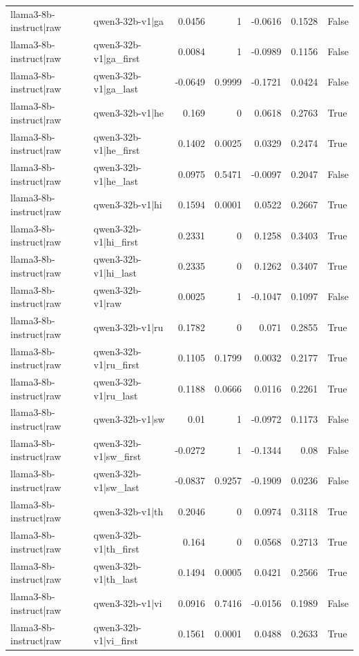 \begin{table}
\begin{tabular}{l l r r r r l}
llama3-8b-instruct|raw & qwen3-32b-v1|ga & 0.0456 & 1 & -0.0616 & 0.1528 & False \\
llama3-8b-instruct|raw & qwen3-32b-v1|ga_first & 0.0084 & 1 & -0.0989 & 0.1156 & False \\
llama3-8b-instruct|raw & qwen3-32b-v1|ga_last & -0.0649 & 0.9999 & -0.1721 & 0.0424 & False \\
llama3-8b-instruct|raw & qwen3-32b-v1|he & 0.169 & 0 & 0.0618 & 0.2763 & True \\
llama3-8b-instruct|raw & qwen3-32b-v1|he_first & 0.1402 & 0.0025 & 0.0329 & 0.2474 & True \\
llama3-8b-instruct|raw & qwen3-32b-v1|he_last & 0.0975 & 0.5471 & -0.0097 & 0.2047 & False \\
llama3-8b-instruct|raw & qwen3-32b-v1|hi & 0.1594 & 0.0001 & 0.0522 & 0.2667 & True \\
llama3-8b-instruct|raw & qwen3-32b-v1|hi_first & 0.2331 & 0 & 0.1258 & 0.3403 & True \\
llama3-8b-instruct|raw & qwen3-32b-v1|hi_last & 0.2335 & 0 & 0.1262 & 0.3407 & True \\
llama3-8b-instruct|raw & qwen3-32b-v1|raw & 0.0025 & 1 & -0.1047 & 0.1097 & False \\
llama3-8b-instruct|raw & qwen3-32b-v1|ru & 0.1782 & 0 & 0.071 & 0.2855 & True \\
llama3-8b-instruct|raw & qwen3-32b-v1|ru_first & 0.1105 & 0.1799 & 0.0032 & 0.2177 & True \\
llama3-8b-instruct|raw & qwen3-32b-v1|ru_last & 0.1188 & 0.0666 & 0.0116 & 0.2261 & True \\
llama3-8b-instruct|raw & qwen3-32b-v1|sw & 0.01 & 1 & -0.0972 & 0.1173 & False \\
llama3-8b-instruct|raw & qwen3-32b-v1|sw_first & -0.0272 & 1 & -0.1344 & 0.08 & False \\
llama3-8b-instruct|raw & qwen3-32b-v1|sw_last & -0.0837 & 0.9257 & -0.1909 & 0.0236 & False \\
llama3-8b-instruct|raw & qwen3-32b-v1|th & 0.2046 & 0 & 0.0974 & 0.3118 & True \\
llama3-8b-instruct|raw & qwen3-32b-v1|th_first & 0.164 & 0 & 0.0568 & 0.2713 & True \\
llama3-8b-instruct|raw & qwen3-32b-v1|th_last & 0.1494 & 0.0005 & 0.0421 & 0.2566 & True \\
llama3-8b-instruct|raw & qwen3-32b-v1|vi & 0.0916 & 0.7416 & -0.0156 & 0.1989 & False \\
llama3-8b-instruct|raw & qwen3-32b-v1|vi_first & 0.1561 & 0.0001 & 0.0488 & 0.2633 & True \\

\end{tabular}
\end{table}
